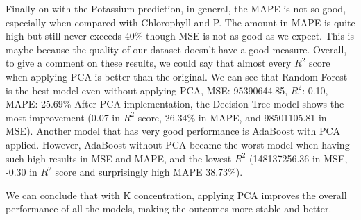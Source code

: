 Finally on with the Potassium prediction, in general, the MAPE is not so good, especially when compared with Chlorophyll and P. The amount in MAPE is quite high but still never exceeds 40\% though MSE is not as good as we expect. This is maybe because the quality of our dataset doesn’t have a good measure. Overall, to give a comment on these results, we could say that almost every \(R^2\)  score when applying PCA is better than the original. We can see that Random Forest is the best model even without applying PCA, MSE: 95390644.85, \(R^2\): 0.10, MAPE: 25.69\%  After PCA implementation, the Decision Tree model shows the most improvement (0.07 in  \(R^2\)  score, 26.34\% in MAPE, and 98501105.81 in MSE). Another model that has very good performance is AdaBoost with PCA applied. However, AdaBoost without PCA became the worst model when having such high results in MSE and MAPE, and the lowest \(R^2\)  (148137256.36 in MSE, -0.30 in \(R^2\)  score and surprisingly high MAPE 38.73\%).

We can conclude that with K concentration, applying PCA improves the overall performance of all the models, making the outcomes more stable and better. 


